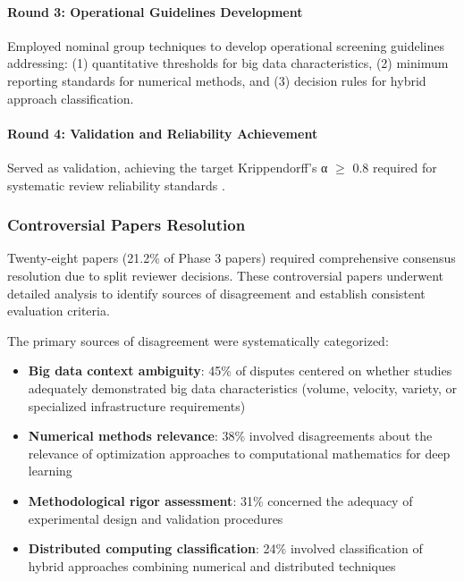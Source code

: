 \documentclass[acmsmall]{acmart}
\begin{document}
\paragraph{Round 3: Operational Guidelines Development}
Employed nominal group techniques \citep{delbecq1971group} to develop operational screening guidelines addressing: (1) quantitative thresholds for big data characteristics, (2) minimum reporting standards for numerical methods, and (3) decision rules for hybrid approach classification.

\paragraph{Round 4: Validation and Reliability Achievement}
Served as validation, achieving the target Krippendorff's α $\geq$ 0.8 required for systematic review reliability standards \citep{krippendorff2004reliability}.

\subsubsection{Controversial Papers Resolution}\label{subsubsec:inter-reviewer-agreement-controversial-papers}

Twenty-eight papers (21.2\% of Phase 3 papers) required comprehensive consensus resolution due to split reviewer decisions. These controversial papers underwent detailed analysis to identify sources of disagreement and establish consistent evaluation criteria.

The primary sources of disagreement were systematically categorized:
\begin{itemize}
    \item \textbf{Big data context ambiguity}: 45\% of disputes centered on whether studies adequately demonstrated big data characteristics (volume, velocity, variety, or specialized infrastructure requirements)
    \item \textbf{Numerical methods relevance}: 38\% involved disagreements about the relevance of optimization approaches to computational mathematics for deep learning
    \item \textbf{Methodological rigor assessment}: 31\% concerned the adequacy of experimental design and validation procedures
    \item \textbf{Distributed computing classification}: 24\% involved classification of hybrid approaches combining numerical and distributed techniques
\end{itemize}
\end{document}
